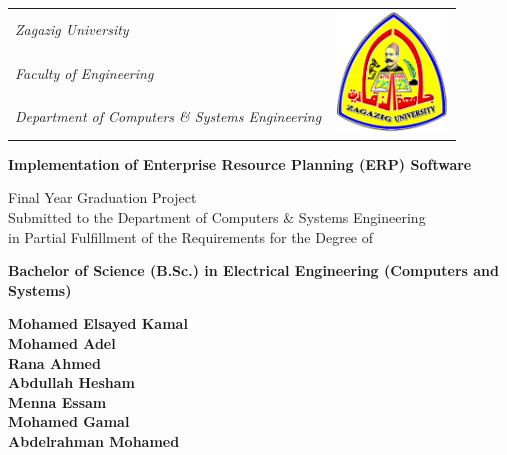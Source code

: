 \documentclass[11pt,a4paper,oneside]{bth}
\begin{document}
\pagestyle{plain}




{\pagestyle{empty}
\changepage{4.5cm}{2.5cm}{-0.5cm}{-1cm}{}{-2cm}{}{}{}
\noindent%
{\large
\begin{tabular}{p{} p{}}
\textit{Zagazig University}&\multirow{3}{*}{\includegraphics[width=3cm, height=3.2cm]{zagazig_uni}}\\
\textit{Faculty of Engineering}\\
\textit{Department of Computers \& Systems Engineering}\\
\end{tabular}}


\begin{center}

\par\vspace {4cm}


{\Huge\textbf{Implementation of Enterprise Resource Planning (ERP) Software}}

\par\vspace {1cm}

{\Large Final Year Graduation Project}\\
{\Large Submitted to the Department of Computers \& Systems Engineering}\\
{\Large in Partial Fulfillment of the Requirements for the Degree of}\\
\par\vspace {.5cm}
{\Large \textbf{Bachelor of Science (B.Sc.) in Electrical Engineering (Computers and Systems)}}


\par\vspace {2cm}

{\Large\textbf{Mohamed Elsayed Kamal}}\\
{\Large\textbf{Mohamed Adel}}\\
{\Large\textbf{Rana Ahmed}}\\
{\Large\textbf{Abdullah Hesham}}\\
{\Large\textbf{Menna Essam}}\\
{\Large\textbf{Mohamed Gamal}}\\
{\Large\textbf{Abdelrahman Mohamed}}\\


\end{center}}
\end{document}
